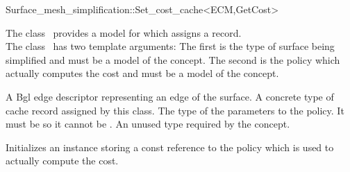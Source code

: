 

\begin{ccRefClass}{Surface_mesh_simplification::Set_cost_cache<ECM,GetCost>}


\ccDefinition

The class \ccRefName\ provides a model for 
which assigns a  record.\\ 
The class \ccRefName\ has two
template arguments: The first is the type of surface being simplified
and must be a model of the  concept. The
second is the policy which actually computes the cost and must
be a model of the  concept.

\ccIsModel
{}


\ccTypes
  \ccGlue
  {A {\sc Bgl} edge descriptor representing an edge of the surface.}
  \ccGlue
  {A concrete type of cache record assigned by this class.}
  \ccGlue
  {The type of the parameters to the  policy. 
  It must be  so it cannot be .}
  \ccGlue
  {An unused type required by the  concept.}

\ccCreation
{}  %

{Initializes an instance storing a const reference to the  policy which is used to actually compute the cost.}


\end{ccRefClass}
